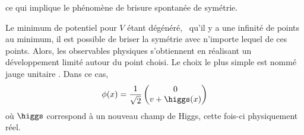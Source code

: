 ce qui implique le phénomène de brisure spontanée de symétrie.
\par Le minimum de potentiel pour $V$ étant dégénéré, \ie\ qu'il y a une infinité de points au minimum, il est possible de briser la symétrie avec n'importe lequel de ces points. Alors, les observables physiques s'obtiennent en réalisant un développement limité autour du point choisi.
Le choix le plus simple est nommé \og jauge unitaire \fg.
Dans ce cas, %
\begin{equation}
\phi(x)
=
\frac{1}{\sqrt{2}}
\begin{pmatrix}
0 \\ v + \higgs(x)
\end{pmatrix}
\label{eq-phi_after_SSB}
\end{equation}
où $\higgs$ correspond à un nouveau champ de Higgs, cette fois-ci physiquement réel.%
